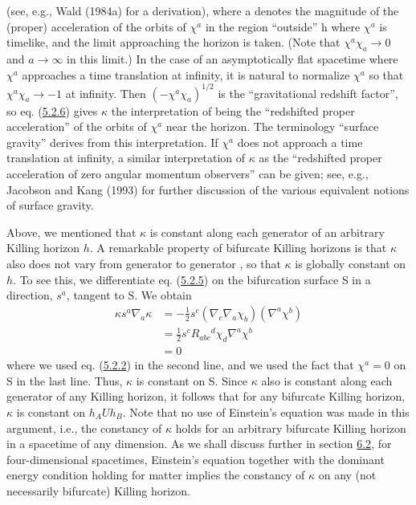 \documentclass[11pt,a4paper]{article}
\begin{document}
(see, e.g., Wald (1984a) for a derivation), where a denotes the magnitude of the (proper) acceleration of the orbits of \(\chi^a\) in the region ``outside'' h where \(\chi^a\) is timelike, and the limit approaching the horizon is taken. (Note that \(\chi^a \chi_a \to 0\) and \(a \to \infty\) in this limit.) In the case of an asymptotically flat spacetime where \(\chi^a\) approaches a time translation at infinity, it is natural to normalize \(\chi^a\) so that \(\chi^a\chi_a\to -1\) at infinity. Then \((-\chi^a \chi_a)^{1/2}\) is the ``gravitational redshift factor'', so eq. (\hyperref[eq:5.2.6]{5.2.6}) gives \(\kappa\) the interpretation of being the ``redshifted proper acceleration'' of the orbits of \(\chi^a\) near the horizon. The terminology ``surface gravity'' derives from this interpretation. If \(\chi^a\) does not approach a time translation at infinity, a similar interpretation of \(\kappa\) as the ``redshifted proper acceleration of zero angular momentum observers'' can be given; see, e.g., Jacobson and Kang (1993) for further discussion of the various equivalent notions of surface gravity.

Above, we mentioned that \(\kappa\) is constant along each generator of an arbitrary Killing horizon \(h\). A remarkable property of bifurcate Killing horizons is that \(\kappa\) also does not vary from generator to generator\hypertarget{source-135}{} , so that \(\kappa\) is globally constant on \(h\). To see this, we differentiate eq. (\hyperref[eq:5.2.5]{5.2.5}) on the bifurcation surface S in a direction, \(s^a\), tangent to S. We obtain
\begin{equation*}
\begin{aligned} \kappa s^a \nabla_a \kappa &= -\frac{1}{2} s^c (\nabla_c \nabla_a \chi_b) (\nabla^a \chi^b) \\ &= \frac{1}{2} s^c R_{abc}{}^d \chi_d \nabla^a \chi^b \\ &= 0 \end{aligned} \tag{5.2.7}\label{eq:5.2.7}
\end{equation*}
where we used eq. (\hyperref[eq:5.2.2]{5.2.2}) in the second line, and we used the fact that \(\chi^a=0\) on S in the last line. Thus, \(\kappa\) is constant on S. Since \(\kappa\) also is constant along each generator of any Killing horizon, it follows that for any bifurcate Killing horizon, \(\kappa\) is constant on \(h_A U h_B\). Note that no use of Einstein's equation was made in this argument, i.e., the constancy of \(\kappa\) holds for an arbitrary bifurcate Killing horizon in a spacetime of any dimension. As we shall discuss further in section \hyperlink{sec:6.2}{6.2}, for four-dimensional spacetimes, Einstein's equation together with the dominant energy condition holding for matter implies the constancy of \(\kappa\) on any (not necessarily bifurcate) Killing horizon.
\end{document}
